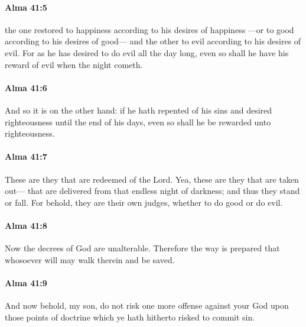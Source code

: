 		\paragraph{Alma 41:5} %
			\label{ALMA-41-5}

			the one restored to happiness according to his desires of happiness
			---or to good according to his desires of good---
			and the other to evil according to his desires of evil.
			For as he has desired to do evil all the day long,
			even so shall he have his reward of evil when the night cometh.

		\paragraph{Alma 41:6} %
			\label{ALMA-41-6}

			And so it is on the other hand:
			if he hath repented of his sins
			and desired righteousness until the end of his days,
			even so shall he be rewarded unto righteousness.

		\paragraph{Alma 41:7} %
			\label{ALMA-41-7}

			These are they that are redeemed of the Lord.
			Yea, these are they that are taken out---
			that are delivered from that endless night of darkness;
			and thus they stand or fall.
			For behold, they are their own judges,
			whether to do good or do evil.

		\paragraph{Alma 41:8} %
			\label{ALMA-41-8}

			Now the decrees of God are unalterable.
			Therefore the way is prepared
			that whosoever will
			may walk therein and be saved.

		\paragraph{Alma 41:9} %
			\label{ALMA-41-9}

			And now behold, my son, do not risk one more offense against your God
			upon those points of doctrine which ye hath hitherto risked to commit sin.

